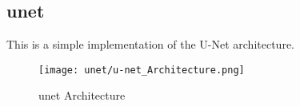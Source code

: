 \subsection{unet}\label{s:unet}

This is a simple implementation of the U-Net architecture.

\begin{figure}[H] 
	\centering
	\texttt{[image: unet/u-net\_Architecture.png]}
	\caption{unet Architecture}\label{fig:unet}
\end{figure}
